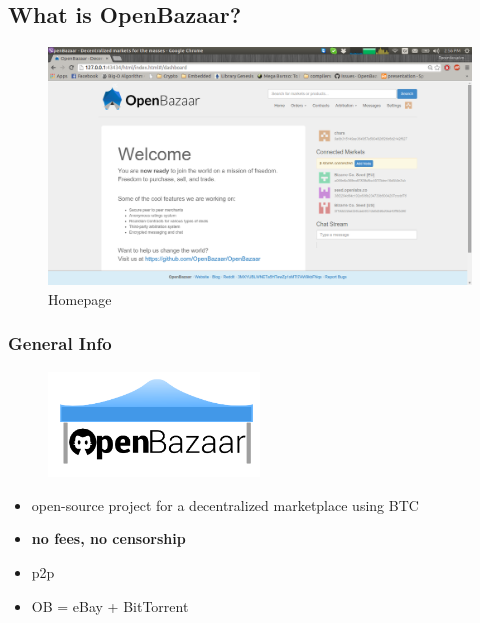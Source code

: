 \documentclass{beamer}
\begin{document}
\subsection{What is OpenBazaar?}
\begin{frame}
\begin{figure}[H]
\centering
\includegraphics[width=1.00\textwidth]{screenshots/OB1.png}
\caption{Homepage}
\end{figure}
\end{frame}
\begin{frame}
\frametitle{General Info} \pause
\begin{figure}[H]
\includegraphics[width=0.50\textwidth]{screenshots/OBlarge.png}
\end{figure}

\begin{itemize}
\item open-source project for a decentralized marketplace using BTC

\item {\bf no fees, no censorship}

\item p2p

\item OB = eBay + BitTorrent

\end{itemize}
\end{frame}
\end{document}
